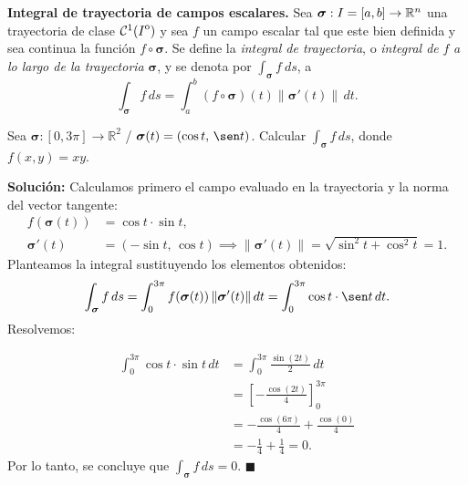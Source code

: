 
\begin{definition}\textbf{Integral de trayectoria de campos escalares.}
    Sea $\boldsymbol{\sigma}:I=[a,b]\to\mathbb{R}^n$ una trayectoria de clase $\mathcal{C}^1({\kern0ptI}^{\mathrm{o}})$ y sea $f$ un campo escalar tal que este bien definida y sea continua   la funci\'on $f\circ\boldsymbol{\sigma}$.  Se define la \emph{integral de trayectoria}, o \emph{integral de} $f$ \emph{a lo largo de la trayectoria} $\boldsymbol{\sigma}$, y se denota por $\int_{\boldsymbol{\sigma}}f\:ds$, a
    \[
        \int_{\boldsymbol{\sigma}}f \, ds=\int_a^b (f\circ\boldsymbol{\sigma})(t)  \|\boldsymbol{\sigma}'(t)\| \, dt.
    \]
\end{definition}

 \begin{example} 
 Sea $\boldsymbol{\sigma} : [0, 3\pi] \to \mathbb{R}^2$ / 
$\boldsymbol{\sigma}(t) = (\cos t,\, \sen t)$. Calcular $\displaystyle\int_{\boldsymbol{\sigma}} f\, ds$,
donde $f(x,y) = xy$.
\end{example}

\noindent\textbf{Solución:} Calculamos primero el campo evaluado en la trayectoria y la norma del vector tangente:
\begin{align*}
f(\boldsymbol{\sigma}(t)) &= \cos t \cdot \sin t, \\[0.2cm]
\boldsymbol{\sigma}'(t) &= (-\sin t,\, \cos t) \implies \|\boldsymbol{\sigma}'(t)\| = \sqrt{\sin^2 t + \cos^2 t} = 1.
\end{align*}
Planteamos la integral sustituyendo los elementos obtenidos:
\[
    \int_{\boldsymbol{\sigma}} f\, ds
    = \int_0^{3\pi} f(\boldsymbol{\sigma}(t))\,\|\boldsymbol{\sigma}'(t)\|\, dt
    = \int_0^{3\pi} \cos t \cdot \sen t \, dt.
\]
Resolvemos:

\begin{align*}
\int_0^{3\pi} \cos t \cdot \sin t\, dt &= \int_0^{3\pi} \frac{\sin(2t)}{2}\, dt \\[0.2cm]
&= \left[ -\frac{\cos(2t)}{4} \right]_0^{3\pi} \\[0.2cm]
&= -\frac{\cos(6\pi)}{4} + \frac{\cos(0)}{4} \\[0.2cm]
&= -\frac{1}{4} + \frac{1}{4} = 0.
\end{align*}
Por lo tanto, se concluye que $\int_{\boldsymbol{\sigma}} f\, ds = 0$. \hfill $\blacksquare$ 



